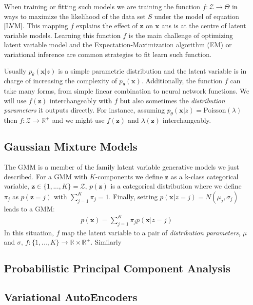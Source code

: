 \documentclass{article}
\newcommand{\x}{\mathbf{x}}
\newcommand{\z}{\mathbf{z}}
\begin{document}
\bigskip

When training or fitting such models we are training the function $f:\mathcal{Z} \rightarrow \Theta$ in ways to maximize the likelihood of the data set $S$ under the model of equation \ref{LVM}. This mapping $f$ explains the effect of $\z$ on $\x$ ans is at the centre of latent variable models. Learning this function $f$ is the main challenge of optimizing latent variable model and the Expectation-Maximization algorithm (EM) or variational inference are common strategies to fit learn such function.

\bigskip

Usually $p_\theta(\x|z)$ is a simple parametric distribution and the latent variable is in charge of increasing the complexity of $p_\theta(\x)$. Additionally, the function $f$ can take many forms, from simple linear combination to neural network functions. We will use $f(\z)$ interchangeably with $f$ but also sometimes the \textit{distribution parameters} it outputs directly. For instance, assuming $p_\theta(\x|z) = \text{Poisson}(\lambda)$ then $f: \mathcal{Z} \rightarrow \mathbb{R}^+$ and we might use $f(\z)$ and $\lambda(\z)$ interchangeably.


\subsection{Gaussian Mixture Models}

The GMM is a member of the family latent variable generative models we just described. For a GMM with $K$-components we define $\z$ as a k-class categorical variable, $\z \in \{1,...,K\} = \mathcal{Z}$, $p(\z)$ is a categorical distribution where we define $\pi_j$ as $p(\z = j)$ with $\sum_{j=1}^K \pi_j =1$. Finally, setting $p(\x|z=j) = N(\mu_j,\sigma_j)$ leads to a GMM:
\begin{align}
p(\x) = \sum_{j=1}^K \pi_j p(\x|z=j) 
\label{LVM}
\end{align}
In this situation, $f$ map the latent variable to a pair of \textit{distribution parameters}, $\mu$ and $\sigma$, $f: \{1,...,K\} \rightarrow \mathbb{R}\times\mathbb{R}^+$. Similarly

\subsection{Probabilistic Principal Component Analysis}

\subsection{Variational AutoEncoders}
\end{document}
